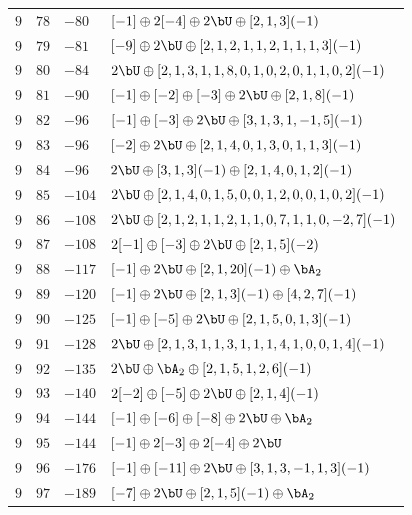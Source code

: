 \begin{center}
\begin{longtable}{llll}
 \(9\) & \(78\) & \(-80\) & \([-1] \oplus 2 [-4] \oplus 2 \bU \oplus [2, 1, 3](-1)\) \\
 \(9\) & \(79\) & \(-81\) & \([-9] \oplus 2 \bU \oplus [2, 1, 2, 1, 1, 2, 1, 1, 1, 3](-1)\) \\
 \(9\) & \(80\) & \(-84\) & \(2 \bU \oplus [2, 1, 3, 1, 1, 8, 0, 1, 0, 2, 0, 1, 1, 0, 2](-1)\) \\
 \(9\) & \(81\) & \(-90\) & \([-1] \oplus [-2] \oplus [-3] \oplus 2 \bU \oplus [2, 1, 8](-1)\) \\
 \(9\) & \(82\) & \(-96\) & \([-1] \oplus [-3] \oplus 2 \bU \oplus [3, 1, 3, 1, -1, 5](-1)\) \\
 \(9\) & \(83\) & \(-96\) & \([-2] \oplus 2 \bU \oplus [2, 1, 4, 0, 1, 3, 0, 1, 1, 3](-1)\) \\
 \(9\) & \(84\) & \(-96\) & \(2 \bU \oplus [3, 1, 3](-1) \oplus [2, 1, 4, 0, 1, 2](-1)\) \\
 \(9\) & \(85\) & \(-104\) & \(2 \bU \oplus [2, 1, 4, 0, 1, 5, 0, 0, 1, 2, 0, 0, 1, 0, 2](-1)\) \\
 \(9\) & \(86\) & \(-108\) & \(2 \bU \oplus [2, 1, 2, 1, 1, 2, 1, 1, 0, 7, 1, 1, 0, -2, 7](-1)\) \\
 \(9\) & \(87\) & \(-108\) & \(2 [-1] \oplus [-3] \oplus 2 \bU \oplus [2, 1, 5](-2)\) \\
 \(9\) & \(88\) & \(-117\) & \([-1] \oplus 2 \bU \oplus [2, 1, 20](-1) \oplus \bA_{2}\) \\
 \(9\) & \(89\) & \(-120\) & \([-1] \oplus 2 \bU \oplus [2, 1, 3](-1) \oplus [4, 2, 7](-1)\) \\
 \(9\) & \(90\) & \(-125\) & \([-1] \oplus [-5] \oplus 2 \bU \oplus [2, 1, 5, 0, 1, 3](-1)\) \\
 \(9\) & \(91\) & \(-128\) & \(2 \bU \oplus [2, 1, 3, 1, 1, 3, 1, 1, 1, 4, 1, 0, 0, 1, 4](-1)\) \\
 \(9\) & \(92\) & \(-135\) & \(2 \bU \oplus \bA_{2} \oplus [2, 1, 5, 1, 2, 6](-1)\) \\
 \(9\) & \(93\) & \(-140\) & \(2 [-2] \oplus [-5] \oplus 2 \bU \oplus [2, 1, 4](-1)\) \\
 \(9\) & \(94\) & \(-144\) & \([-1] \oplus [-6] \oplus [-8] \oplus 2 \bU \oplus \bA_{2}\) \\
 \(9\) & \(95\) & \(-144\) & \([-1] \oplus 2 [-3] \oplus 2 [-4] \oplus 2 \bU\) \\
 \(9\) & \(96\) & \(-176\) & \([-1] \oplus [-11] \oplus 2 \bU \oplus [3, 1, 3, -1, 1, 3](-1)\) \\
 \(9\) & \(97\) & \(-189\) & \([-7] \oplus 2 \bU \oplus [2, 1, 5](-1) \oplus \bA_{2}\) \\

\end{longtable}
\end{center}

